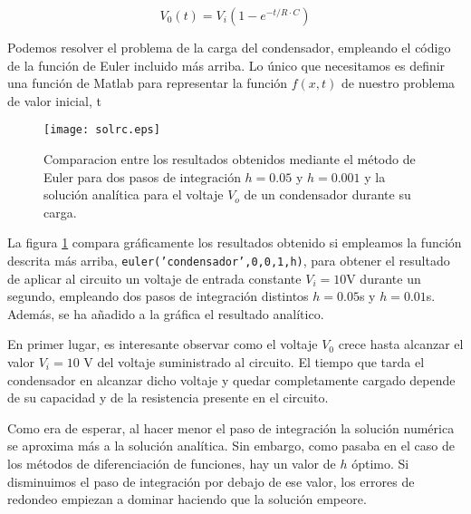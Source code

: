 \begin{equation*}
V_0(t)=V_i\left(1-e^{-t/R\cdot C}\right)
\end{equation*} 


Podemos resolver el problema de la carga del condensador, empleando el código de la función de Euler incluido más arriba. Lo único que necesitamos es definir una función de Matlab  para representar la función $f(x,t)$ de nuestro problema de valor inicial, t
%
%

\begin{figure}[h]
\centering
\texttt{[image: solrc.eps]}
\caption{Comparacion entre los resultados obtenidos mediante el método de Euler para dos pasos de integración $h=0.05$ y $h=0.001$ y la solución analítica para el voltaje $V_o$ de un condensador durante su carga.}
\label{fig:solrc}
\end{figure}

La figura \ref{fig:solrc} compara gráficamente los resultados obtenido si empleamos la función descrita más arriba, \texttt{euler('condensador',0,0,1,h)}, para obtener el resultado de aplicar al circuito un voltaje de entrada constante $V_i=10$V durante un segundo, empleando dos pasos de integración distintos $h=0.05$s  y $h=0.01$s. Además, se ha añadido a la gráfica el resultado analítico.

En primer lugar, es interesante observar como el voltaje $V_0$ crece hasta alcanzar el valor $V_i=10$ V del voltaje suministrado al circuito. El tiempo que tarda el condensador en alcanzar dicho voltaje y quedar completamente cargado depende de su capacidad y de la resistencia presente en el circuito.

Como era de esperar, al hacer menor el paso de integración la solución numérica se aproxima más a la solución analítica. Sin embargo, como pasaba en el caso de los métodos de diferenciación de funciones, hay un valor de $h$ óptimo. Si disminuimos el paso de integración por debajo de ese valor, los errores de redondeo empiezan a dominar haciendo que la solución empeore.

